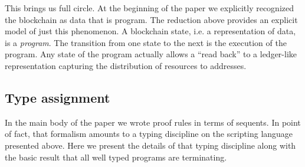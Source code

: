\documentclass[]{acm_proc_article-sp}
\numberwithin{equation}{subsection}
\begin{document}
This brings us full circle. At the beginning of the paper we
explicitly recognized the blockchain as data that is program. The
reduction above provides an explicit model of just this phenomenon. A
blockchain state, i.e. a representation of data, is a
\emph{program}. The transition from one state to the next is the
execution of the program. Any state of the program actually allows a
``read back'' to a ledger-like representation capturing the
distribution of resources to addresses.

\subsection{Type assignment}

In the main body of the paper we wrote proof rules in terms of
sequents. In point of fact, that formalism amounts to a typing
discipline on the scripting language presented above. Here we present
the details of that typing discipline along with the basic result that
all well typed programs are terminating.

\begin{mathpar}
\end{mathpar}

\begin{mathpar}
\end{mathpar}

\begin{mathpar}
\end{mathpar}

\begin{mathpar}
\end{mathpar}
\end{document}
